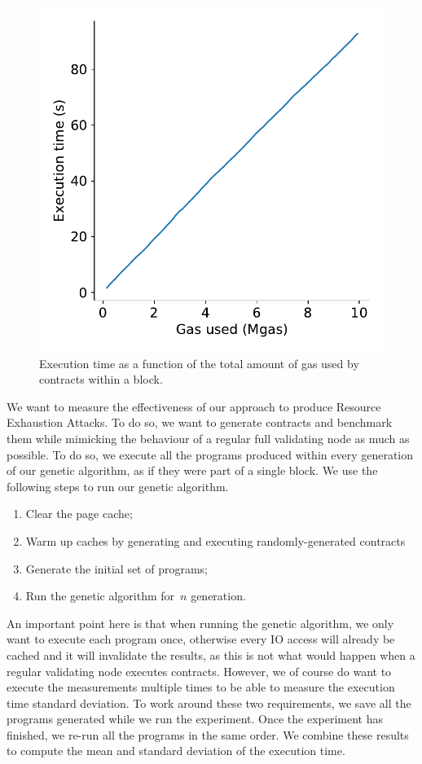   \begin{figure}[tb]
    \centering
    \includegraphics[width=.7\columnwidth]{./3-vm-security/figures/block-execution-time.pdf}
    \caption[Execution time as a function of the gas used by contracts within a block]{Execution time as a function of the total amount of gas used by contracts within a block.}
    \label{fig:block-exec-speed}
  \end{figure}

  We want to measure the effectiveness of our approach to produce Resource Exhaustion Attacks. To do so, we want to generate contracts and benchmark them while mimicking the behaviour of a regular full validating node as much as possible. To do so, we execute all the programs produced within every generation of our genetic algorithm, as if they were part of a single block. We use the following steps to run our genetic algorithm.

  \begin{enumerate}
    \item Clear the page cache;
    \item Warm up caches by generating and executing randomly-generated contracts
    \item Generate the initial set of programs;
    \item Run the genetic algorithm for~$n$ generation.
  \end{enumerate}
  An important point here is that when running the genetic algorithm, we only want to execute each program once, otherwise every IO access will already be cached and it will invalidate the results, as this is not what would happen when a regular validating node executes contracts. However, we of course do want to execute the measurements multiple times to be able to measure the execution time standard deviation. To work around these two requirements, we save all the programs generated while we run the experiment.
  Once the experiment has finished, we re-run all the programs in the same order. We combine these results to compute the mean and standard deviation of the execution time.


